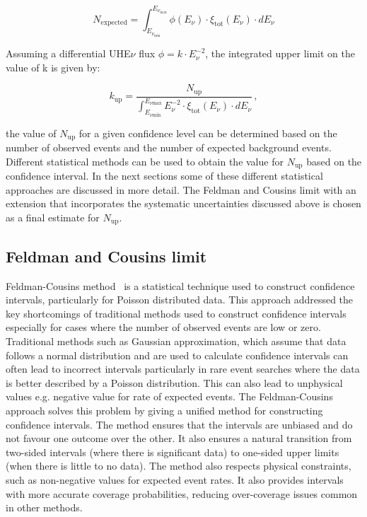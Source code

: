 \begin{equation}
  N_{\text{expected}} = \int_{E_{\nu_{\text{min}}}}^{E_{\nu_{\text{max}}}} \phi(E_{\nu}) \cdot \xi_{\text{tot}}(E_{\nu}) \cdot dE_{\nu}
\end{equation}

Assuming a differential UHE$\nu$ flux $\phi = k \cdot E_{\nu}^{-2}$, the integrated upper limit on the value of k is given by:

\begin{equation}
  \label{eq:integ_lim}
  k_{\text{up}} = \frac{N_{\text{up}}}{\int_{E_{\nu \text{min}}}^{E_{\nu \text{max}}} E_{\nu}^{-2} \cdot \xi_{\text{tot}}(E_{\nu}) \cdot dE_{\nu}} \, ,
\end{equation}

the value of $N_{\text{up}}$ for a given confidence level can be determined based on the number of observed events and the number of expected background events. Different statistical methods can be used to obtain the value for $N_{\text{up}}$ based on the confidence interval. In the next sections some of these different statistical approaches are discussed in more detail. The Feldman and Cousins limit with an extension that incorporates the systematic uncertainties discussed above is chosen as a final estimate for $N_{\text{up}}$.

\subsection{Feldman and Cousins limit}
\label{subsec:FandC}
Feldman-Cousins method~\cite{Feldman:1997qc} is a statistical technique used to construct confidence intervals, particularly for Poisson distributed data. This approach addressed the key shortcomings of traditional methods used to construct confidence intervals especially for cases where the number of observed events are low or zero. Traditional methods such as Gaussian approximation, which assume that data follows a normal distribution and are used to calculate confidence intervals can often lead to incorrect intervals particularly in rare event searches where the data is better described by a Poisson distribution. This can also lead to unphysical values e.g. negative value for rate of expected events. The Feldman-Cousins approach solves this problem by giving a unified method for constructing confidence intervals. The method ensures that the intervals are unbiased and do not favour one outcome over the other. It also ensures a natural transition from two-sided intervals (where there is significant data) to one-sided upper limits (when there is little to no data). The method also respects physical constraints, such as non-negative values for expected event rates. It also provides intervals with more accurate coverage probabilities, reducing over-coverage issues common in other methods. 

